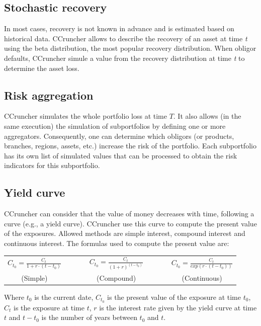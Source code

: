 \documentclass[a4paper,12pt,final]{article}
\begin{document}
\subsection{Stochastic recovery}
In most cases, recovery is not known in advance and is estimated based on historical data. 
CCruncher allows to describe the recovery of an asset at time \emph{t} using the beta 
distribution, the most popular recovery distribution. When obligor defaults, 
CCruncher simule a value from the recovery distribution at time \emph{t} 
to determine the asset loss.

\subsection{Risk aggregation}
CCruncher simulates the whole portfolio loss at time $T$. It also allows (in 
the same execution) the simulation of subportfolios by defining one or more 
aggregators. Consequently, one can determine which obligors (or products, 
branches, regions, assets, etc.) increase the risk of the portfolio. 
Each subportfolio has its own list of simulated values that can be processed to 
obtain the risk indicators for this subportfolio.

\subsection{Yield curve}
CCruncher can consider that the value of money decreases with time, following a 
curve (e.g., a yield curve). CCruncher use this curve to compute the present value 
of the exposures. Allowed methods are simple interest, compound interest and
continuous interest. The formulas used to compute the present value are:

\begin{center}
\begin{tabular}{ccccc}
$C_{t_0} = \frac{C_t}{1+r \cdot (t-t_0)}$ & $\qquad$ &
$C_{t_0} = \frac{C_t}{(1+r)^{(t-t_0)}}$ & $\qquad$ &
$C_{t_0} = \frac{C_t}{exp(r \cdot (t-t_0))}$ \\
(Simple) & $\qquad$ & (Compound) & $\qquad$ & (Continuous)
\end{tabular}
\end{center}

Where $t_0$ is the current date, $C_{t_0}$ is the present value of the exposure at 
time $t_0$, $C_t$ is the exposure at time $t$, $r$ is the interest rate given by the 
yield curve at time $t$ and $t-t_0$ is the number of years between $t_0$ and $t$.
\end{document}
